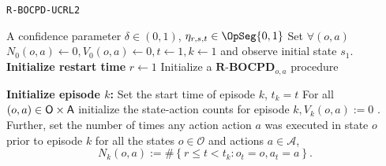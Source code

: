 \documentclass{article} %
\begin{document}
\begin{algorithm}[H]
	\caption{\texttt{R-BOCPD-UCRL2}} \label{alg:R-UCRL}
	\begin{algorithmic}[1]
		\REQUIRE A confidence parameter $\delta \in (0,1)$,  $\eta_{r,s,t}\in \OpSeg{0,1}$
    \STATE Set $\forall (o,a)$ $N_{0}(o, a) \leftarrow 0, V_{0}(o, a) \leftarrow 0, t \leftarrow 1, k \leftarrow 1$ and observe initial state $s_{1}$.
    \STATE \textbf{Initialize restart time} $r \leftarrow 1 $
		\STATE Initialize a $\textbf{R-BOCPD}_{o,a}$ procedure
	\ENDFOR

     \STATE \textbf{Initialize episode $k$:}
		\STATE \Space Set the start time of episode $k$, $t_{k}=t$
        \STATE \Space For all $(o, a) \in {\mathsf{O}} \times {\mathsf{A}}$ initialize the state-action counts for episode $k, V_k(o, a):=0$  . Further, set the number of times any action action $a$ was executed in state $o$ prior to episode $k$ for all the states $o \in \mathcal{O}$ and actions $a \in \mathcal{A}$,
$$
N_k(o, a):=\#\left\{r \leq t < t_k: o_t=o, a_t=a\right\} .
$$


\end{algorithmic}
\end{algorithm}
\end{document}
